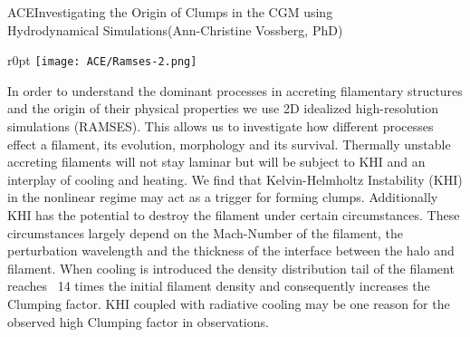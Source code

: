 \begin{section}{ACE}{Investigating the Origin of Clumps in the CGM using \\
    \hspace*{4cm} Hydrodynamical Simulations}{(Ann-Christine Vossberg, PhD)}
  \begin{minipage}{\linewidth}
    \begin{wrapfigure}{r}{0pt}
      \texttt{[image: ACE/Ramses-2.png]}
    \end{wrapfigure}
    \strut {\small In order to understand the dominant processes in accreting
      filamentary structures and the origin of their physical properties we use
      2D idealized high-resolution simulations (RAMSES). This allows us to
      investigate how different processes effect a filament, its evolution,
      morphology and its survival. Thermally unstable accreting filaments will
      not stay laminar but will be subject to KHI and an interplay of cooling
      and heating. We find that Kelvin-Helmholtz Instability (KHI) in the
      nonlinear regime may act as a trigger for forming clumps. Additionally KHI
      has the potential to destroy the filament under certain circumstances.
      These circumstances largely depend on the Mach-Number of the filament, the
      perturbation wavelength and the thickness of the interface between the
      halo and filament. When cooling is introduced the density distribution
      tail of the filament reaches ~14 times the initial filament density and
      consequently increases the Clumping factor. KHI coupled with radiative
      cooling may be one reason for the observed high Clumping factor in
      observations.}
  \end{minipage}
\end{section}